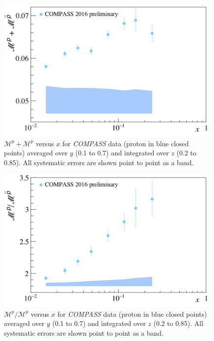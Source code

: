 \documentclass[letterpaper,12pt]{article}
\begin{document}
\begin{figure}[H]
	\centering
	\includegraphics[scale=0.55]{./gfx/Ps.png}
	\caption{$\mathscr{M}^{p}+\mathscr{M}^{\bar{p}}$ versus $x$ for \textit{COMPASS} data (proton in blue  closed points) averaged over $y$ (0.1 to 0.7) and integrated over $z$ (0.2 to 0.85). All systematic errors are shown point to point as a band.}
	\label{Ps}
\end{figure}

\begin{figure}[H]
	\centering
	\includegraphics[scale=0.55]{./gfx/Pr.png}
	\caption{$\mathscr{M}^{p}/\mathscr{M}^{\bar{p}}$ versus $x$ for \textit{COMPASS} data (proton in blue closed points) averaged over $y$ (0.1 to 0.7) and integrated over $z$ (0.2 to 0.85). All systematic errors are shown point to point as a band.}
	\label{Pr}
\end{figure}

\newpage
\end{document}
